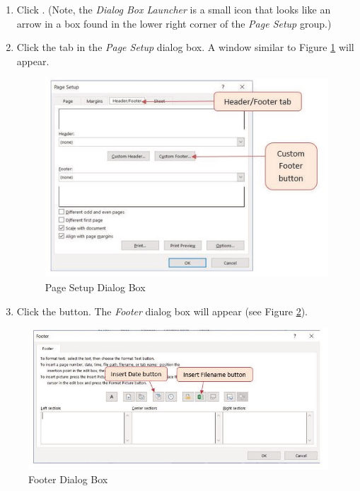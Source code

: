 \begin{enumbox}
	\begin{enumerate}
		\item Click . (Note, the \textit{Dialog Box Launcher} is a small icon that looks like an arrow in a box found in the lower right corner of the \textit{Page Setup} group.)
		\item Click the  tab in the \textit{Page Setup} dialog box. A window similar to Figure \ref{02:fig44} will appear.

		\begin{figure}[H]
			\centering
			\includegraphics[width=\maxwidth{.95\linewidth}]{gfx/ch02_fig44}
			\caption{Page Setup Dialog Box}
			\label{02:fig44}
		\end{figure}

		\item Click the  button. The \textit{Footer} dialog box will appear (see Figure \ref{02:fig45}).
	\end{enumerate}
\end{enumbox}

\begin{figure}[H]
	\centering
	\includegraphics[width=\maxwidth{.95\linewidth}]{gfx/ch02_fig45}
	\caption{Footer Dialog Box}
	\label{02:fig45}
\end{figure}


